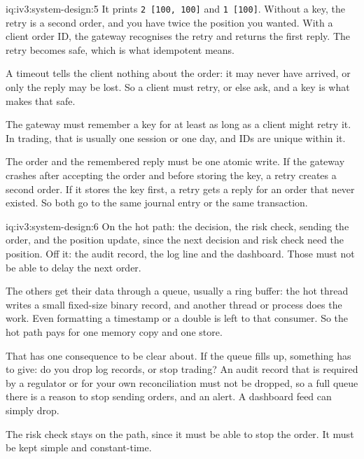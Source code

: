 \begin{solution}{iq:iv3:system-design:5}
It prints \texttt{2 [100, 100]} and \texttt{1 [100]}. Without a key, the retry is a second order, and you have twice the position you wanted. With a client order ID, the gateway recognises the retry and returns the first reply. The retry becomes safe, which is what idempotent means.

A timeout tells the client nothing about the order: it may never have arrived, or only the reply may be lost. So a client must retry, or else ask, and a key is what makes that safe.

The gateway must remember a key for at least as long as a client might retry it. In trading, that is usually one session or one day, and IDs are unique within it.

The order and the remembered reply must be one atomic write. If the gateway crashes after accepting the order and before storing the key, a retry creates a second order. If it stores the key first, a retry gets a reply for an order that never existed. So both go to the same journal entry or the same transaction.

\end{solution}

\begin{solution}{iq:iv3:system-design:6}
On the hot path: the decision, the risk check, sending the order, and the position update, since the next decision and risk check need the position. Off it: the audit record, the log line and the dashboard. Those must not be able to delay the next order.

The others get their data through a queue, usually a ring buffer: the hot thread writes a small fixed-size binary record, and another thread or process does the work. Even formatting a timestamp or a double is left to that consumer. So the hot path pays for one memory copy and one store.

That has one consequence to be clear about. If the queue fills up, something has to give: do you drop log records, or stop trading? An audit record that is required by a regulator or for your own reconciliation must not be dropped, so a full queue there is a reason to stop sending orders, and an alert. A dashboard feed can simply drop.

The risk check stays on the path, since it must be able to stop the order. It must be kept simple and constant-time.

\end{solution}

